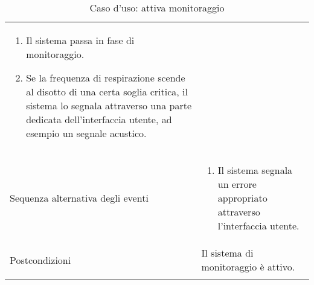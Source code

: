\begin{table}
\begin{tabular}{p{} p{}}
\begin{enumerate}
	\item	
	  Il sistema passa in fase di monitoraggio.
	\item
	  Se la frequenza di respirazione scende al disotto di una certa soglia critica, il sistema lo segnala attraverso una parte dedicata dell'interfaccia utente, ad esempio un segnale acustico.
      \end{enumerate}      
  \\
      Sequenza alternativa degli eventi
    &
      \begin{enumerate}
	\item 
	  Il sistema segnala un errore appropriato attraverso l'interfaccia utente.
      \end{enumerate}      
  \\
      Postcondizioni
    &
      Il sistema di monitoraggio \`e attivo. 
  \\\\
  \hline
  \end{tabular}
   \caption{Caso d'uso: attiva monitoraggio}
   \label{casoDUsoMonitoraggio}
   \end{table}




